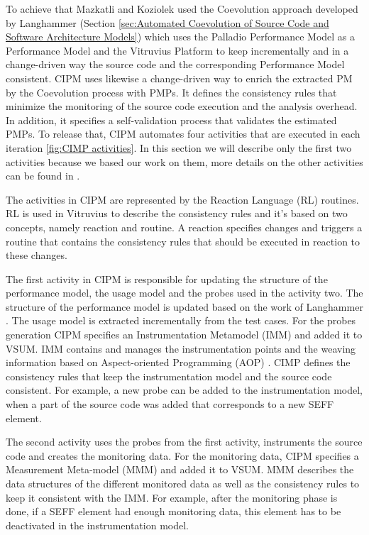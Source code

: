 To achieve that Mazkatli and Koziolek used the Coevolution approach developed by Langhammer (Section \ref{sec:Automated Coevolution of Source Code and Software Architecture Models}) which uses the Palladio Performance Model as a Performance Model and the Vitruvius Platform to keep incrementally and in a change-driven way the source code and the corresponding Performance Model consistent. CIPM uses likewise a change-driven way to enrich the extracted PM by the Coevolution process with PMPs. It defines the consistency rules that minimize the monitoring of the source code execution and the analysis overhead. In addition, it specifies a self-validation process that validates the estimated PMPs. To release that, CIPM automates four activities that are executed in each iteration \ref{fig:CIMP activities}. In this section we will describe only the first two activities because we based our work on them, more details on the other activities can be found in \cite{mazkatli2018continuous}.

The activities in CIPM are represented by the Reaction Language (RL) routines. RL is used in Vitruvius to describe the consistency rules and it's based on two concepts, namely reaction and routine. A reaction specifies changes and triggers a routine that contains the consistency rules that should be executed in reaction to these changes.  

The first activity in CIPM is responsible for updating the structure of the performance model, the usage model and the probes used in the activity two. The structure of the performance model is updated based on the work of Langhammer \cite{langhammer2015co}. The usage model is extracted incrementally from the test cases. For the probes generation CIPM specifies an Instrumentation Metamodel (IMM) and added it to VSUM. IMM contains and manages the instrumentation points and the weaving information based on Aspect-oriented Programming (AOP) \cite{kiczales1997j}. CIMP defines the consistency rules that keep the instrumentation model and the source code consistent. For example, a new probe can be added to the instrumentation model, when a part of the source code was added that corresponds to a new SEFF element. 

The second activity uses the probes from the first activity, instruments the source code and creates the monitoring data. For the monitoring data, CIPM specifies a Measurement Meta-model (MMM) and added it to VSUM. MMM describes the data structures of the different monitored data as well as the consistency rules to keep it consistent with the IMM. For example, after the monitoring phase is done, if a SEFF element had enough monitoring data, this element has to be deactivated in the instrumentation model. 

